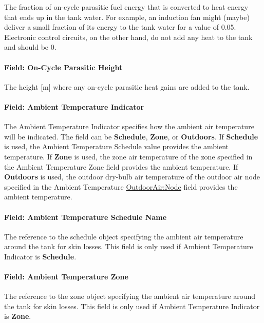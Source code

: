 The fraction of on-cycle parasitic fuel energy that is converted to heat energy that ends up in the tank water. For example, an induction fan might (maybe) deliver a small fraction of its energy to the tank water for a value of 0.05. Electronic control circuits, on the other hand, do not add any heat to the tank and should be 0.

\paragraph{Field: On-Cycle Parasitic Height}\label{field-on-cycle-parasitic-height}

The height {[}m{]} where any on-cycle parasitic heat gains are added to the tank.

\paragraph{Field: Ambient Temperature Indicator}\label{field-ambient-temperature-indicator-1-000}

The Ambient Temperature Indicator specifies how the ambient air temperature will be indicated. The field can be \textbf{Schedule}, \textbf{Zone}, or \textbf{Outdoors}. If \textbf{Schedule} is used, the Ambient Temperature Schedule value provides the ambient temperature. If \textbf{Zone} is used, the zone air temperature of the zone specified in the Ambient Temperature Zone field provides the ambient temperature. If \textbf{Outdoors} is used, the outdoor dry-bulb air temperature of the outdoor air node specified in the Ambient Temperature \hyperref[outdoorairnode]{OutdoorAir:Node} field provides the ambient temperature.

\paragraph{Field: Ambient Temperature Schedule Name}\label{field-ambient-temperature-schedule-name-1-000}

The reference to the schedule object specifying the ambient air temperature around the tank for skin losses. This field is only used if Ambient Temperature Indicator is \textbf{Schedule}.

\paragraph{Field: Ambient Temperature Zone}\label{field-ambient-temperature-zone}

The reference to the zone object specifying the ambient air temperature around the tank for skin losses. This field is only used if Ambient Temperature Indicator is \textbf{Zone}.

